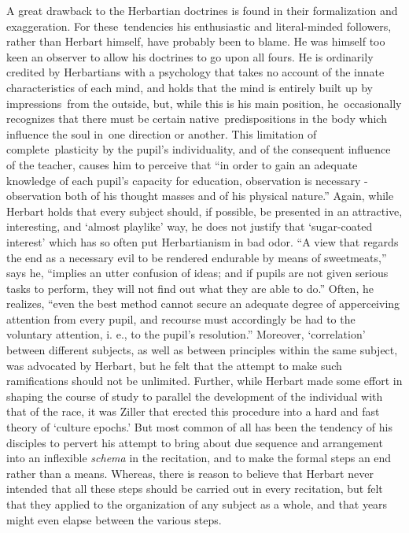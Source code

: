\documentclass[
]{book}
\begin{document}
A great drawback to the Herbartian doctrines is found in their formalization and exaggeration. For these~tendencies his enthusiastic and literal-minded followers, rather than Herbart himself, have probably been to blame. He was himself too keen an observer to allow his doctrines to go upon all fours. He is ordinarily credited by Herbartians with a psychology that takes no account of the innate characteristics of each mind, and holds that the mind is entirely built up by impressions~from the outside, but, while this is his main position, he~occasionally recognizes that there must be certain native~predispositions in the body which influence the soul in~one direction or another. This limitation of complete~plasticity by the pupil's individuality, and of the consequent influence of the teacher, causes him to perceive that ``in order to gain an adequate knowledge of each pupil's capacity for education, observation is necessary - observation both of his thought masses and of his physical nature.'' Again, while Herbart holds that every subject should, if possible, be presented in an attractive, interesting, and `almost playlike' way, he does not justify that `sugar-coated interest' which has so often put Herbartianism in bad odor. ``A view that regards the end as a necessary evil to be rendered endurable by means of sweetmeats,'' says he, ``implies an utter confusion of ideas; and if pupils are not given serious tasks to perform, they will not find out what they are able to do.'' Often, he realizes, ``even the best method cannot secure an adequate degree of apperceiving attention from every pupil, and recourse must accordingly be had to the voluntary attention, i. e., to the pupil's resolution.'' Moreover, `correlation' between different subjects, as well as between principles within the same subject, was advocated by Herbart, but he felt that the attempt to make such ramifications should not be unlimited. Further, while Herbart made some effort in shaping the course of study to parallel the development of the individual with that of the race, it was Ziller that erected this procedure into a hard and fast theory of `culture epochs.' But most common of all has been the tendency of his disciples to pervert his attempt to bring about due sequence and arrangement into an inflexible \emph{schema} in the recitation, and to make the formal steps an end rather than a means. Whereas, there is reason to believe that Herbart never intended that all these steps should be carried out in every recitation, but felt that they applied to the organization of any subject as a whole, and that years might even elapse between the various steps.
\end{document}
